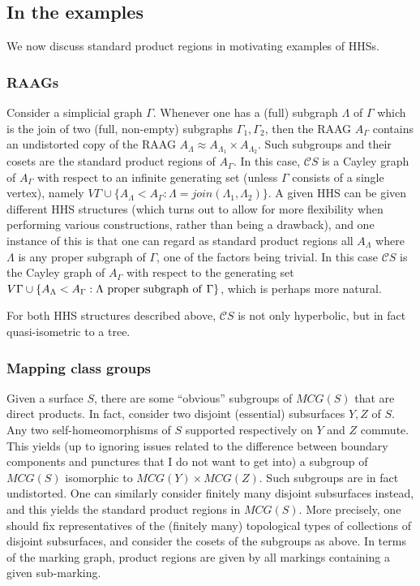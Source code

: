 \documentclass[11pt,oneside]{amsart}
\theoremstyle{definition}
\newcommand{\fontact}{{\mathcal C}}
\begin{document}
\subsection{In the examples}

We now discuss standard product regions in motivating examples of HHSs.

\subsubsection{RAAGs}
Consider a simplicial graph $\Gamma$. Whenever one has a (full) subgraph $\Lambda$ of $\Gamma$ which is the join of two (full, non-empty) subgraphs $\Gamma_1,\Gamma_2$, then the RAAG $A_\Gamma$ contains an undistorted copy of the RAAG $A_\Lambda\approx A_{\Lambda_1}\times A_{\Lambda_2}$. Such subgroups and their cosets are the standard product regions of $A_\Gamma$. In this case, $\fontact S$ is a Cayley graph of $A_\Gamma$ with respect to an infinite generating set (unless $\Gamma$ consists of a single vertex), namely $V\Gamma\cup\{A_\Lambda<A_\Gamma:\Lambda=join(\Lambda_1,\Lambda_2)\}$. A given HHS can be given different HHS structures (which turns out to allow for more flexibility when performing various constructions, rather than being a drawback), and one instance of this is that one can regard as standard product regions all $A_\Lambda$ where $\Lambda$ is any proper subgraph of $\Gamma$, one of the factors being trivial. In this case $\fontact S$ is the Cayley graph of $A_\Gamma$ with respect to the generating set $V\Gamma\cup \{A_\Lambda<A_\Gamma:\Lambda{\rm\ proper\ subgraph\ of\ }\Gamma\}$, which is perhaps more natural.

For both HHS structures described above, $\fontact S$ is not only hyperbolic, but in fact quasi-isometric to a tree.

\subsubsection{Mapping class groups}
Given a surface $S$, there are some ``obvious'' subgroups of $MCG(S)$ that are direct products. In fact, consider two disjoint (essential) subsurfaces $Y,Z$ of $S$. Any two self-homeomorphisms of $S$ supported respectively on $Y$ and $Z$ commute. This yields (up to ignoring issues related to the difference between boundary components and punctures that I do not want to get into) a subgroup of $MCG(S)$ isomorphic to $MCG(Y)\times MCG(Z)$. Such subgroups are in fact undistorted. One can similarly consider finitely many disjoint subsurfaces instead, and this yields the standard product regions in $MCG(S)$. More precisely, one should fix representatives of the (finitely many) topological types of collections of disjoint subsurfaces, and consider the cosets of the subgroups as above. In terms of the marking graph, product regions are given by all markings containing a given sub-marking.
\end{document}
